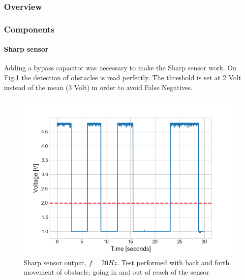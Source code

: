 \documentclass[10pt]{beamer}
\begin{document}
\begin{frame}
\frametitle{Overview}
\tableofcontents[currentsection,subsectionstyle=shaded]
\end{frame}

\begin{frame}
\frametitle{Components}
\framesubtitle{Sharp sensor}
Adding a bypass capacitor was necessary to make the Sharp sensor work. On Fig.\ref{fig:sharp-flow} the detection of obstacles is read perfectly. The threshold is set at 2 Volt instead of the mean (3 Volt) in order to avoid False Negatives.
\vspace*{-2mm}
\begin{figure}[hbtp]
\centering
\includegraphics[scale=0.45]{figures/sharp-flow.png}
\vspace*{-2mm}
\caption{Sharp sensor output, $f=20Hz$. Test performed with back and forth movement of obstacle, going in and out of reach of the sensor.}
\label{fig:sharp-flow}
\end{figure}
\end{frame}


\end{document}

